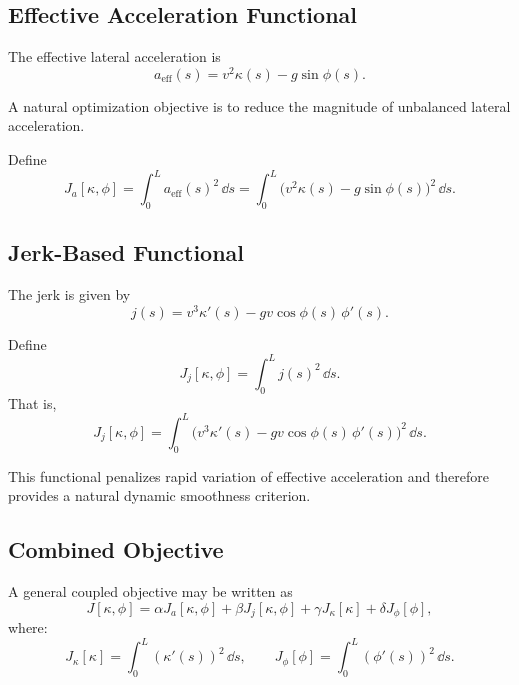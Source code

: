 \subsection{Effective Acceleration Functional}

\begin{definition}
The effective lateral acceleration is
\[
a_{\mathrm{eff}}(s)
=
v^2 \kappa(s) - g \sin\phi(s).
\]
\end{definition}

\begin{remark}
A natural optimization objective is to reduce the magnitude of
unbalanced lateral acceleration.
\end{remark}

\begin{definition}
Define
\[
J_a[\kappa,\phi]
=
\int_0^L a_{\mathrm{eff}}(s)^2 \,\dd s
=
\int_0^L
\bigl(v^2 \kappa(s) - g \sin\phi(s)\bigr)^2
\,\dd s.
\]
\end{definition}

\subsection{Jerk-Based Functional}

\begin{definition}[Jerk]
The jerk is given by
\[
j(s)
=
v^3 \kappa'(s) - g v \cos\phi(s)\,\phi'(s).
\]
\end{definition}

\begin{definition}
Define
\[
J_j[\kappa,\phi]
=
\int_0^L j(s)^2 \,\dd s.
\]
That is,
\[
J_j[\kappa,\phi]
=
\int_0^L
\bigl(
v^3 \kappa'(s) - g v \cos\phi(s)\,\phi'(s)
\bigr)^2
\,\dd s.
\]
\end{definition}

\begin{remark}
This functional penalizes rapid variation of effective acceleration and
therefore provides a natural dynamic smoothness criterion.
\end{remark}

\subsection{Combined Objective}

\begin{definition}
A general coupled objective may be written as
\[
J[\kappa,\phi]
=
\alpha J_a[\kappa,\phi]
+
\beta J_j[\kappa,\phi]
+
\gamma J_\kappa[\kappa]
+
\delta J_\phi[\phi],
\]
where:
\[
J_\kappa[\kappa]
=
\int_0^L (\kappa'(s))^2 \,\dd s,
\qquad
J_\phi[\phi]
=
\int_0^L (\phi'(s))^2 \,\dd s.
\]
\end{definition}

